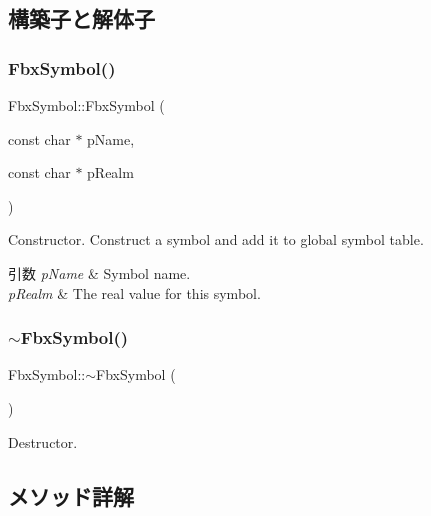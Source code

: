 \subsection{構築子と解体子}
\mbox{\label{class_fbx_symbol_ac9c03734e434a83ec3ef918864cd3e85}} 
\subsubsection{\texorpdfstring{Fbx\+Symbol()}{FbxSymbol()}}
{\footnotesize\ttfamily Fbx\+Symbol\+::\+Fbx\+Symbol (\begin{DoxyParamCaption}\item[{const char $\ast$}]{p\+Name,  }\item[{const char $\ast$}]{p\+Realm }\end{DoxyParamCaption})}

Constructor. Construct a symbol and add it to global symbol table. 
\begin{DoxyParams}{引数}
{\em p\+Name} & Symbol name. \\
\hline
{\em p\+Realm} & The real value for this symbol. \\
\hline
\end{DoxyParams}
\mbox{\label{class_fbx_symbol_a50d2302a5d037c49c5f0744a87acdf5f}} 
\subsubsection{\texorpdfstring{$\sim$\+Fbx\+Symbol()}{~FbxSymbol()}}
{\footnotesize\ttfamily Fbx\+Symbol\+::$\sim$\+Fbx\+Symbol (\begin{DoxyParamCaption}{ }\end{DoxyParamCaption})}



Destructor. 



\subsection{メソッド詳解}
\mbox{\label{class_fbx_symbol_ad09b7aceadb22213dad8208edaf9cce4}} 
